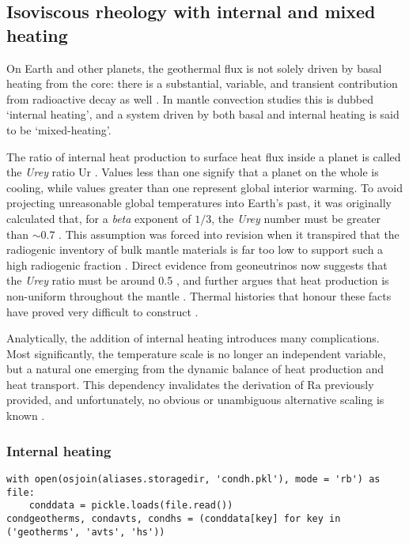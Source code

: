\subsection{Isoviscous rheology with internal and mixed heating}

On Earth and other planets, the geothermal flux is not solely driven by basal heating from the core: there is a substantial, variable, and transient contribution from radioactive decay as well \cite{Daly1980-xl}. In mantle convection studies this is dubbed `internal heating', and a system driven by both basal and internal heating is said to be `mixed-heating'.

The ratio of internal heat production to surface heat flux inside a planet is called the \textit{Urey} ratio $\mathrm{Ur}$  \cite{Urey1955-zs}. Values less than one signify that a planet on the whole is cooling, while values greater than one represent global interior warming. To avoid projecting unreasonable global temperatures into Earth's past, it was originally calculated that, for a \textit{beta} exponent of $1/3$, the \textit{Urey} number must be greater than $\sim0.7$ \cite{Christensen1985-bu}. This assumption was forced into revision when it transpired that the radiogenic inventory of bulk mantle materials is far too low to support such a high radiogenic fraction \cite{Jochum1983-dn}. Direct evidence from geoneutrinos now suggests that the \textit{Urey} ratio must be around 0.5 \cite{Gando2011-sh}, and further argues that heat production is non-uniform throughout the mantle \cite{Huang2013-eu}. Thermal histories that honour these facts have proved very difficult to construct \citet{Korenaga2003-oy, Korenaga2008-js, Mareschal2012-ie, Dye2012-cx, Jaupart2015-un, Korenaga2017-an}.

Analytically, the addition of internal heating introduces many complications. Most significantly, the temperature scale is no longer an independent variable, but a natural one emerging from the dynamic balance of heat production and heat transport. This dependency invalidates the derivation of $\mathrm{Ra}$ previously provided, and unfortunately, no obvious or unambiguous alternative scaling is known \citet{Schubert2001-ea, Moore2008-je, Korenaga2017-an}.

\subsubsection{Internal heating}

\begin{verbatim}
with open(osjoin(aliases.storagedir, 'condh.pkl'), mode = 'rb') as file:
    conddata = pickle.loads(file.read())
condgeotherms, condavts, condhs = (conddata[key] for key in ('geotherms', 'avts', 'hs'))
\end{verbatim}

